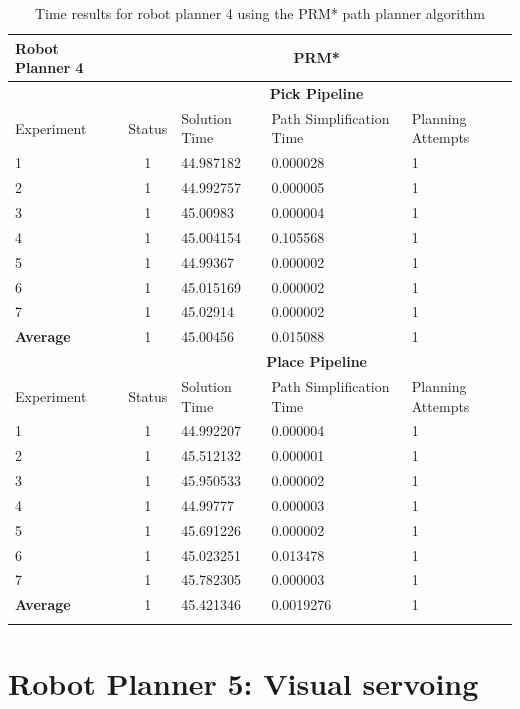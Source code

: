 \begin{longtable}{|p{2cm}|c|p{3cm}|p{3cm}|p{3cm}|}
\hline
Robot Planner 4           & \multicolumn{4}{c}{\textbf{PRM*}}                                                                                                 \vline \\
\hline
                          & \multicolumn{4}{c}{\textbf{Pick Pipeline}}                     \vline \\
\hline
Experiment                & Status & Solution Time & Path Simplification Time & Planning Attempts  \\
\hline
1	& 1	& 44.987182	& 0.000028	& 1 \\
2	& 1	& 44.992757	& 0.000005	& 1 \\
3	& 1	& 45.00983	& 0.000004	& 1 \\
4	& 1	& 45.004154	& 0.105568	& 1 \\
5	& 1	& 44.99367	& 0.000002	& 1 \\
6	& 1	& 45.015169	& 0.000002	& 1 \\
7	& 1	& 45.02914	& 0.000002	& 1 \\
\hline
\textbf{Average} & 1	& 45.00456	& 0.015088	& 1 \\
\hline
                          & \multicolumn{4}{c}{\textbf{Place Pipeline}}                     \vline \\
\hline
Experiment                & Status & Solution Time & Path Simplification Time & Planning Attempts  \\
\hline
1	& 1	& 44.992207	& 0.000004	& 1 \\
2	& 1	& 45.512132	& 0.000001	& 1 \\
3	& 1	& 45.950533	& 0.000002	& 1 \\
4	& 1	& 44.99777	& 0.000003	& 1 \\
5	& 1	& 45.691226	& 0.000002	& 1 \\
6	& 1	& 45.023251	& 0.013478	& 1 \\
7	& 1	& 45.782305	& 0.000003	& 1 \\
\hline
\textbf{Average}	& 1	& 45.421346	& 0.0019276	& 1 \\
\hline
\caption{Time results for robot planner 4 using the PRM* path planner algorithm}
\label{robot-planner4-prmstar-data}
\end{longtable}


\section{Robot Planner 5: Visual servoing}

